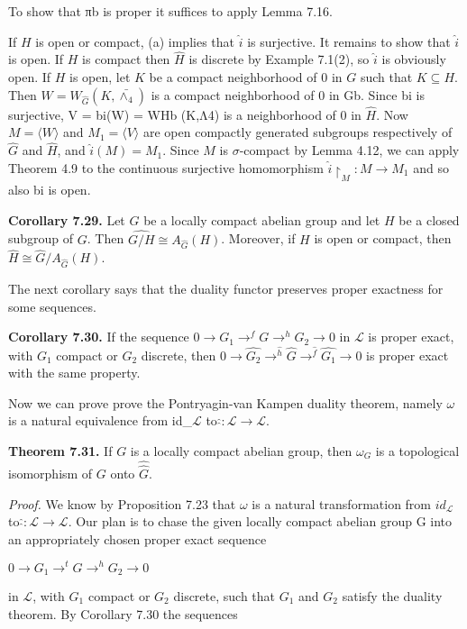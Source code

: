 \documentclass[12pt]{article}
\begin{document}
    To show that πb is proper it suffices to apply Lemma 7.16.


    If $H$ is open or compact, (a) implies that $\hat{i}$ is surjective. It remains to show that $\hat{i}$ is open. If $H$ is compact
then $\hat{H}$ is discrete by Example 7.1(2), so $\hat{i}$ is obviously open. If $H$ is open, let $K$ be a compact neighborhood
of 0 in $G$ such that $K \subseteq H$. Then $W = W_{\hat{G}}(K,\bar{\wedge_4})$ is a compact neighborhood of 0 in Gb. Since bi is surjective,
V = bi(W) = WHb (K,Λ4) is a neighborhood of 0 in $\hat{H}$. Now $M = \langle W \rangle$ and $M_1 = \langle V \rangle$ are open compactly
generated subgroups respectively of $\hat{G}$ and $\hat{H}$, and $\hat{i}(M) = M_1$. Since $M$ is $\sigma$-compact by Lemma 4.12, we can
apply Theorem 4.9 to the continuous surjective homomorphism $\hat{i} \upharpoonright_M: M \to M_1$ and so also bi is open.

 
\textbf{Corollary 7.29.} Let $G$ be a locally compact abelian group and let $H$ be a closed subgroup of $G$. Then
$\hat{G/H} \cong A_{\hat{G}}(H)$. Moreover, if $H$ is open or compact, then $\hat{H} \cong \hat{G}/A_{\hat{G}}(H)$.


    The next corollary says that the duality functor preserves proper exactness for some sequences.


\textbf{Corollary 7.30.} If the sequence $0 \to G_1 \to^f G \to^h G_2 → 0$ in $\mathcal{L}$ is proper exact, with $G_1$ compact or $G_2$ discrete,
then $0 \to \hat{G_2} \to^{\hat{h}} \hat{G} \to^{\hat{f}} \hat{G_1} \to 0$ is proper exact with the same property.


    Now we can prove prove the Pontryagin-van Kampen duality theorem, namely $\omega$ is a natural equivalence
from id_$\mathcal{L}$ to $\hat{\hat{}}: \mathcal{L} \to \mathcal{L}$.



\textbf{Theorem 7.31.} If $G$ is a locally compact abelian group, then $\omega_G$ is a topological isomorphism of $G$ onto $\hat{\hat{G}}$.


\emph{Proof.} We know by Proposition 7.23 that $\omega$ is a natural transformation from $id_\mathcal{L}$ to $\hat{\hat{}}: \mathcal{L} \to \mathcal{L}$. Our plan is to
chase the given locally compact abelian group G into an appropriately chosen proper exact sequence


    $0 \to G_1 \to^t G \to^h G_2 \to 0$


in $\mathcal{L}$, with $G_1$ compact or $G_2$ discrete, such that $G_1$ and $G_2$ satisfy the duality theorem. By Corollary 7.30 the
sequences
\end{document}
